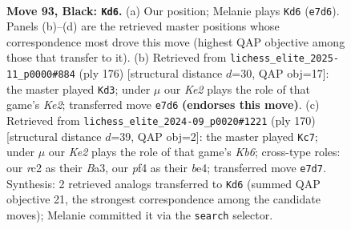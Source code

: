 \documentclass[11pt]{article}
\begin{document}
\begin{figure}[p]\centering
\begin{subfigure}{0.46\textwidth}\centering
\resizebox{\linewidth}{!}{%
\newchessgame
\chessboard[
  setfen={8/4kr2/p7/P1p2p1p/1pp2P1P/4P1P1/1PR3K1/8 b - - 7 93},
  showmover=false,
  pgfstyle=straightmove, color=movearrow, markmove={e7-d6}
]}
\caption{}
\end{subfigure}\hfill
\begin{subfigure}{0.46\textwidth}\centering
\resizebox{\linewidth}{!}{%
\newchessgame
\chessboard[
  setfen={8/1p6/p1p1rkp1/P6p/1P3P1P/4P3/4K3/1R6 w - - 13 89},
  showmover=false,
  pgfstyle=straightmove, color=movearrow, markmove={e2-d3}
]}
\caption{}
\end{subfigure}
\\[4pt]
\begin{subfigure}{0.46\textwidth}\centering
\resizebox{\linewidth}{!}{%
\newchessgame
\chessboard[
  setfen={1r4k1/5p1p/1K2p1pP/2R1P1P1/p3b3/B5P1/8/8 w - - 57 86},
  showmover=false,
  pgfstyle=straightmove, color=movearrow, markmove={b6-c7}
]}
\caption{}
\end{subfigure}\hfill

\caption{\textbf{Move 93, Black: \texttt{Kd6}.} (a) Our position; Melanie plays \texttt{Kd6} (\texttt{e7d6}). Panels (b)--(d) are the retrieved master positions whose correspondence most drove this move (highest QAP objective among those that transfer to it). (b) Retrieved from \texttt{lichess\_elite\_2025-11\_p0000\#884} (ply 176) [structural distance $d$=30, QAP obj=17]: the master played \texttt{Kd3}; under $\mu$ our \emph{Ke2} plays the role of that game's \emph{Ke2}; transferred move \texttt{e7d6} \textbf{(endorses this move)}. (c) Retrieved from \texttt{lichess\_elite\_2024-09\_p0020\#1221} (ply 170) [structural distance $d$=39, QAP obj=2]: the master played \texttt{Kc7}; under $\mu$ our \emph{Ke2} plays the role of that game's \emph{Kb6}; cross-type roles: our \emph{r}c2 as their \emph{B}a3, our \emph{p}f4 as their \emph{b}e4; transferred move \texttt{e7d7}. Synthesis: 2 retrieved analogs transferred to \texttt{Kd6} (summed QAP objective 21, the strongest correspondence among the candidate moves); Melanie committed it via the \texttt{search} selector.}
\label{fig:thought-m185}
\end{figure}

\clearpage
\end{document}
